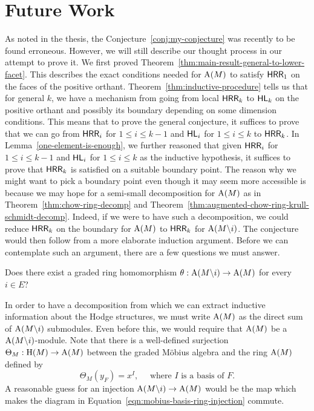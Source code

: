 \documentclass{puthesis-UG}
\begin{document}
\section{Future Work} \label{sec:future-work}

As noted in the thesis, the Conjecture~\ref{conj:my-conjecture} was recently to be found erroneous. However, we will still describe our thought process in our attempt to prove it. We first proved Theorem~\ref{thm:main-result-general-to-lower-facet}. This describes the exact conditions needed for $\operatorname{A}(M)$ to satisfy $\mathsf{HRR}_1$ on the faces of the positive orthant. Theorem~\ref{thm:inductive-procedure} tells us that for general $k$, we have a mechanism from going from local $\mathsf{HRR}_k$ to $\mathsf{HL}_k$ on the positive orthant and possibly its boundary depending on some dimension conditions. This means that to prove the general conjecture, it suffices to prove that we can go from $\mathsf{HRR}_i$ for $1 \leq i \leq k-1$ and $\mathsf{HL}_i$ for $1 \leq i \leq k$ to $\mathsf{HRR}_k$. In Lemma~\ref{one-element-is-enough}, we further reasoned that given $\mathsf{HRR}_i$ for $1 \leq i \leq k-1$ and $\mathsf{HL}_i$ for $1 \leq i \leq k$ as the inductive hypothesis, it suffices to prove that $\mathsf{HRR}_k$ is satisfied on a suitable boundary point. The reason why we might want to pick a boundary point even though it may seem more accessible is because we may hope for a semi-small decomposition for $\operatorname{A}(M)$ as in Theorem~\ref{thm:chow-ring-decomp} and Theorem~\ref{thm:augmented-chow-ring-krull-schmidt-decomp}. Indeed, if we were to have such a decomposition, we could reduce $\mathsf{HRR}_k$ on the boundary for $\operatorname{A}(M)$ to $\mathsf{HRR}_k$ for $\operatorname{A}(M \backslash i)$. The conjecture would then follow from a more elaborate induction argument. Before we can contemplate such an argument, there are a few questions we must answer. 
\begin{question}
	Does there exist a graded ring homomorphism $\theta : \operatorname{A}(M \backslash i) \to \operatorname{A}(M)$ for every $i \in E$? 
\end{question}
In order to have a decomposition from which we can extract inductive information about the Hodge structures, we must write $\operatorname{A}(M)$ as the direct sum of $\operatorname{A}(M \backslash i)$ submodules. Even before this, we would require that $\operatorname{A}(M)$ be a $\operatorname{A}(M \backslash i)$-module. Note that there is a well-defined surjection $\Theta_M : \operatorname{H}(M) \to \operatorname{A}(M)$ between the graded M\"obius algebra and the ring $\operatorname{A}(M)$ defined by 
\[
	\Theta_{M}(y_F) = x^I, \quad \text{ where $I$ is a basis of $F$}.
\]
A reasonable guess for an injection $\operatorname{A}(M \backslash i) \to \operatorname{A}(M)$ would be the map which makes the diagram in Equation~\ref{eqn:mobius-basis-ring-injection} commute. 
\end{document}
